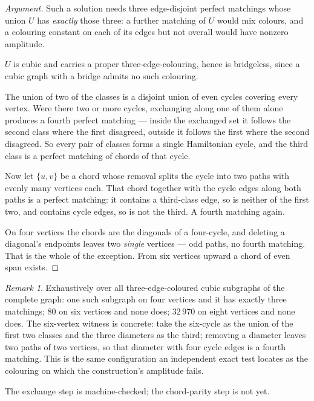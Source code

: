 \documentclass[11pt]{article}
\theoremstyle{definition}
\theoremstyle{remark}
\newtheorem{remark}[theorem]{Remark}
\begin{document}
\begin{proof}[Argument]
Such a solution needs three edge-disjoint perfect matchings whose union $U$ has
\emph{exactly} those three: a further matching of $U$ would mix colours, and a
colouring constant on each of its edges but not overall would have nonzero
amplitude.

$U$ is cubic and carries a proper three-edge-colouring, hence is bridgeless, since a
cubic graph with a bridge admits no such colouring.

The union of two of the classes is a disjoint union of even cycles covering every
vertex. Were there two or more cycles, exchanging along one of them alone produces a
fourth perfect matching --- inside the exchanged set it follows the second class
where the first disagreed, outside it follows the first where the second disagreed.
So every pair of classes forms a single Hamiltonian cycle, and the third class is a
perfect matching of chords of that cycle.

Now let $\{u,v\}$ be a chord whose removal splits the cycle into two paths with
evenly many vertices each. That chord together with the cycle edges along both paths
is a perfect matching: it contains a third-class edge, so is neither of the first
two, and contains cycle edges, so is not the third. A fourth matching again.

On four vertices the chords are the diagonals of a four-cycle, and deleting a
diagonal's endpoints leaves two \emph{single} vertices --- odd paths, no fourth
matching. That is the whole of the exception. From six vertices upward a chord of
even span exists.
\end{proof}

\begin{remark}
Exhaustively over all three-edge-coloured cubic subgraphs of the complete graph:
one such subgraph on four vertices and it has exactly three matchings; $80$ on six
vertices and none does; $32\,970$ on eight vertices and none does. The six-vertex
witness is concrete: take the six-cycle as the union of the first two classes and
the three diameters as the third; removing a diameter leaves two paths of two
vertices, so that diameter with four cycle edges is a fourth matching. This is the
same configuration an independent exact test locates as the colouring on which the
construction's amplitude fails.
\end{remark}

\noindent The exchange step is machine-checked; the chord-parity step is not yet.
\end{document}
